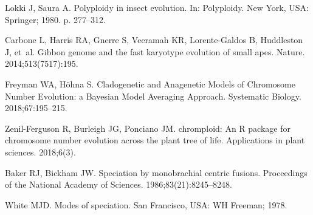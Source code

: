 \documentclass[]{rsos}%
\begin{document}
\begin{thebibliography}{9}
Lokki J, Saura A.
 Polyploidy in insect evolution.
 In: Polyploidy. New York, USA: Springer; 1980. p. 277--312.

Carbone L, Harris RA, Gnerre S, Veeramah KR, Lorente-Galdos B, Huddleston J,
  et~al.
 Gibbon genome and the fast karyotype evolution of small apes.
 Nature. 2014;513(7517):195.

Freyman WA, H{\"o}hna S.
 Cladogenetic and Anagenetic Models of Chromosome Number Evolution: a
  {B}ayesian Model Averaging Approach.
 Systematic Biology. 2018;67:195--215.

Zenil-Ferguson R, Burleigh JG, Ponciano JM.
 chromploid: An R package for chromosome number evolution across the
  plant tree of life.
 Applications in plant sciences. 2018;6(3).

Baker RJ, Bickham JW.
 Speciation by monobrachial centric fusions.
 Proceedings of the National Academy of Sciences.
  1986;83(21):8245--8248.

White MJD.
 Modes of speciation.
 San Francisco, USA: WH Freeman; 1978.
 

\end{thebibliography}
\end{document}
